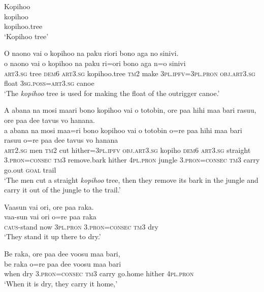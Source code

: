 \ea\label{ex:text17-1}
Kopihoo\\
\gll kopihoo\\
     kopihoo.tree\\
\glt `Kopihoo tree'
\z

\ea\label{ex:text17-2}
O naono vai o kopihoo na paku riori bono aga no sinivi.\\
\gll o	naono	vai	o	kopihoo	na	paku	ri=ori	bono	aga	n=o	sinivi\\
     \textsc{art}3.\textsc{sg}	tree	\textsc{dem}6	\textsc{art}3.\textsc{sg}	kopihoo.tree	\textsc{tm}2	make	3\textsc{pl}.\textsc{ipfv}=3\textsc{pl}.\textsc{pron}	\textsc{obj}.\textsc{art}3.\textsc{sg}	float	3\textsc{sg}.\textsc{poss}=\textsc{art}3.\textsc{sg}	canoe\\
\glt `The \textit{kopihoo} tree is used for making the float of the outrigger canoe.'
\z

\ea\label{ex:text17-3}
A abana na mosi maari bono kopihoo vai o totobin, ore paa hihi maa bari rasuu, ore paa dee tavus vo hanana.\\
\gll a	abana	na	mosi	maa=ri	bono	kopihoo	vai	o	totobin	o=re	paa	hihi	maa	bari	rasuu	o=re	paa	dee	tavus	vo	hanana\\
     \textsc{art}2.\textsc{sg}	men	\textsc{tm}2	cut	hither=3\textsc{pl}.\textsc{ipfv}	\textsc{obj}.\textsc{art}3.\textsc{sg}	kopiho	\textsc{dem}6	\textsc{art}3.\textsc{sg}	straight	3.\textsc{pron}=\textsc{consec}	\textsc{tm}3	remove.bark	hither	4\textsc{pl}.\textsc{pron}	jungle	3.\textsc{pron}=\textsc{consec}	\textsc{tm}3	carry	go.out	\textsc{goal}	trail\\
\glt `The men cut a straight \textit{kopihoo} tree, then they remove its bark in the jungle and carry it out of the jungle to the trail.'
\z

\ea\label{ex:text17-4}
Vaasun vai ori, ore paa raka.\\
\gll vaa-sun	vai	ori	o=re	paa	raka\\
     \textsc{caus}-stand	now	3\textsc{pl}.\textsc{pron}	3.\textsc{pron}=\textsc{consec}	\textsc{tm}3	dry\\
\glt `They stand it up there to dry.'
\z

\ea\label{ex:text17-5}
Be raka, ore paa dee voosu maa bari,\\
\gll be	raka	o=re	paa	dee	voosu	maa	bari\\
     when	dry	3.\textsc{pron}=\textsc{consec}	\textsc{tm}3	carry	go.home	hither	4\textsc{pl}.\textsc{pron}\\
\glt `When it is dry, they carry it home,'
\z

